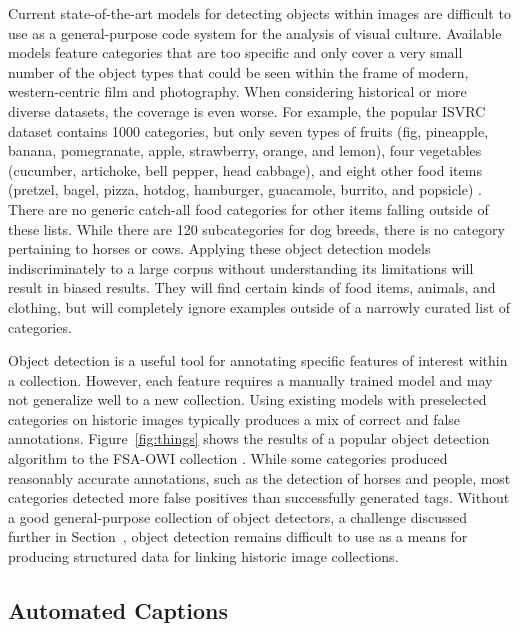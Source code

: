 \documentclass[10pt, a4paper]{article}
\newcommand{\secref}[1]{\StrSubstitute{\getrefnumber{#1}}{.}{ }}
\begin{document}
Current state-of-the-art models for detecting objects within images are difficult
to use as a general-purpose code system for the analysis of visual culture.
Available models feature categories that are too specific and only cover
a very small number of the object types that could be seen within the frame
of modern, western-centric film and photography. When considering historical
or more diverse datasets, the coverage is even worse. For example, the popular
ISVRC dataset contains 1000 categories, but only seven types of fruits
(fig, pineapple, banana, pomegranate, apple, strawberry, orange, and lemon),
four vegetables (cucumber, artichoke, bell pepper, head cabbage), and eight
other food items (pretzel, bagel, pizza, hotdog, hamburger, guacamole, burrito,
and popsicle) \cite{russakovsky2015imagenet}. There are no generic catch-all
food categories for other items falling outside of these lists. While there are
120 subcategories for dog breeds, there is no category pertaining to horses or
cows. Applying these object detection models indiscriminately to a large corpus
without understanding its limitations will result in biased results. They will
find certain kinds of food items, animals, and clothing, but will completely
ignore examples outside of a narrowly curated  list of categories.

Object detection is a useful tool for annotating specific features of interest
within a collection. However, each feature requires a manually trained model
and may not generalize well to a new collection. Using existing models with
preselected categories on historic images typically produces a mix of
correct and false annotations. Figure~\ref{fig:things} shows the results
of a popular object detection algorithm to the FSA-OWI collection
\cite{wu2019detectron2}. While some categories produced reasonably accurate
annotations, such as the detection of horses and people, most categories detected
more false positives than successfully generated tags. Without a good general-purpose
collection of object detectors, a challenge discussed further in
Section~\secref{sec:conclude}, object detection remains difficult to use as a means
for producing structured data for linking historic image collections.

\subsection{Automated Captions}
\end{document}
